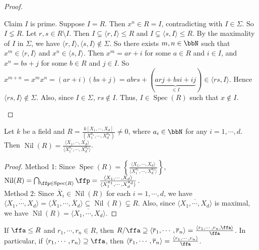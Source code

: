 \begin{proof}
\begin{enumerate}[(a)]
            Claim $I$ is prime. Suppose $I = R$. Then $x^n \in R = I$, contradicting with $I \in \Sigma$. So $I \lneq R$. Let $r,s \in R \setminus I$. Then $I \subsetneq \langle r,I \rangle \leq R$ and $I \subsetneq \langle s,I \rangle \leq R$. By the maximality of $I$ in $\Sigma$, we have $\langle r,I \rangle, \langle s,I \rangle \not \in \Sigma$. So there exists $m,n \in \bbN$ such that $x^m \in \langle r,I \rangle$ and $x^n \in \langle s,I \rangle$. Then $x^m = ar+i$ for some $a \in R$ and $i \in I$, and $x^n = bs + j$ for some $b \in R$ and $j \in I$. So $x^{m+n} = x^m x^n = (ar+i)(bs+j) = abrs + (\underbrace{arj+bsi+ij}_{\in I}) \in \langle rs,I \rangle$. Hence $\langle rs, I \rangle \not\in \Sigma$. Also, since $I \in \Sigma$, $rs \not \in I$. Thus, $I \in \operatorname{Spec}(R)$ such that $x \not \in I$.
    \end{enumerate}
\end{proof}

\begin{example*}
    Let $k$ be a field and $R = \frac{k[X_1,\cdots,X_d]}{(X_1^{a_1},\cdots,X_d^{a_d})} \neq 0$, where $a_i \in \bbN$ for any $i = 1,\cdots,d$. Then $\operatorname{Nil}(R) = \frac{\langle X_1,\cdots,X_d \rangle}{\langle X_1^{a_1},\cdots,X_d^{a_d} \rangle}$.
\end{example*}

\begin{proof}
    Method 1: Since $\operatorname{Spec}(R) = \left\{\frac{\langle X_1,\cdots,X_d \rangle}{\langle X_1^{a_1},\cdots,X_d^{a_d} \rangle}\right\}$, $\operatorname{Nil}(R) = \bigcap_{\ffp \in \operatorname{Spec}(R)} \ffp =  \frac{\langle X_1,\cdots,X_d \rangle}{\langle X_1^{a_1},\cdots,X_d^{a_d} \rangle}$. \\
    Method 2: Since $\overline X_i \in \operatorname{Nil}(R)$ for each $i = 1,\cdots,d$, we have $\overline {\langle X_1,\cdots,X_d \rangle} = \langle \overline X_1,\cdots,\overline X_d \rangle \subseteq \operatorname{Nil}(R) \subsetneq R$. Also, since $\overline {\langle X_1,\cdots,X_d \rangle}$ is maximal, we have $\operatorname{Nil}(R) = \overline {\langle X_1,\cdots,X_d \rangle}$.
\end{proof}

\begin{fact}
    If $\ffa \leq R$ and $r_1,\cdots,r_n \in R$, then $R/\ffa \supseteq \langle \overline r_1,\cdots,\overline r_n \rangle = \frac{\langle r_1,\cdots,r_n, \ffa \rangle}{\ffa}$. In particular, if $\langle r_1,\cdots,r_n \rangle \supseteq \ffa$, then $\langle \overline r_1, \cdots, \overline r_n \rangle = \frac{\langle r_1,\cdots,r_n \rangle}{\ffa}$.
\end{fact}

